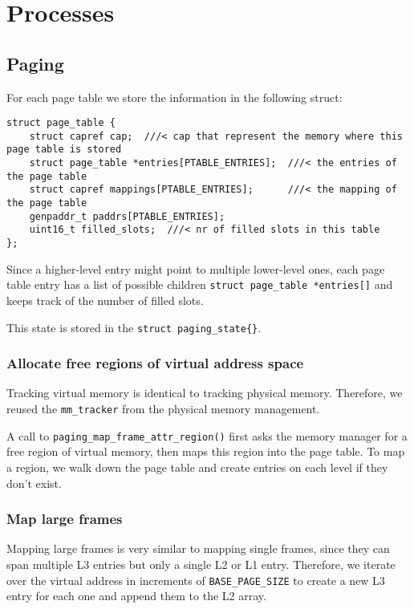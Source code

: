 \chapter{Processes}

\section{Paging}

For each page table we store the information in the following struct:
\begin{verbatim}
struct page_table {
    struct capref cap;  ///< cap that represent the memory where this page table is stored
    struct page_table *entries[PTABLE_ENTRIES];  ///< the entries of the page table
    struct capref mappings[PTABLE_ENTRIES];      ///< the mapping of the page table
    genpaddr_t paddrs[PTABLE_ENTRIES];
    uint16_t filled_slots;  ///< nr of filled slots in this table
};
\end{verbatim}

Since a higher-level entry might point to multiple lower-level ones, each page table entry has a list of possible children \verb|struct page_table *entries[]| and keeps track of the number of filled slots.

This state is stored in the \verb|struct paging_state{}|.

\subsection{Allocate free regions of virtual address space}
Tracking virtual memory is identical to tracking physical memory. Therefore, we reused the \verb|mm_tracker| from the physical memory management. 

A call to \verb|paging_map_frame_attr_region()| first asks the memory manager for a free region of virtual memory, then maps this region into the page table. To map a region, we walk down the page table and create entries on each level if they don't exist.

\subsection{Map large frames}
Mapping large frames is very similar to mapping single frames, since they can span multiple L3 entries but only a single L2 or L1 entry. Therefore, we iterate over the virtual address in increments of \verb|BASE_PAGE_SIZE| to create a new L3 entry for each one and append them to the L2 array.

